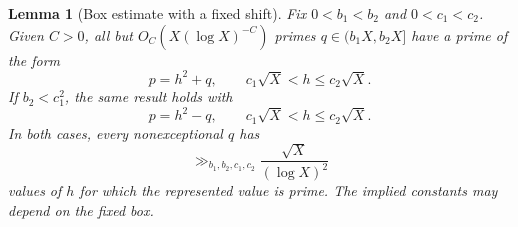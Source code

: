 \documentclass[12pt,reqno]{amsart}
\numberwithin{equation}{section}
\theoremstyle{plain}
\newtheorem{lemma}[theorem]{Lemma}
\theoremstyle{remark}
\begin{document}
\begin{lemma}[Box estimate with a fixed shift]
\label{lem:good-small}
Fix $0<b_1<b_2$ and $0<c_1<c_2$.  Given $C>0$, all but
$O_C(X(\log X)^{-C})$ primes $q\in(b_1X,b_2X]$ have a prime of the form
\begin{equation}\label{plus-prime-in-box}
 p=h^2+q,
 \qquad c_1\sqrt X<h\leq c_2\sqrt X.
\end{equation}
If $b_2<c_1^2$, the same result holds with
\begin{equation}\label{minus-prime-in-box}
 p=h^2-q,
 \qquad c_1\sqrt X<h\leq c_2\sqrt X.
\end{equation}
In both cases, every nonexceptional $q$ has
\begin{equation}\label{many-small-endpoints}
 \gg_{b_1,b_2,c_1,c_2}\frac{\sqrt X}{(\log X)^2}
\end{equation}
values of $h$ for which the represented value is prime.  The implied
constants may depend on the fixed box.
\end{lemma}
\end{document}
